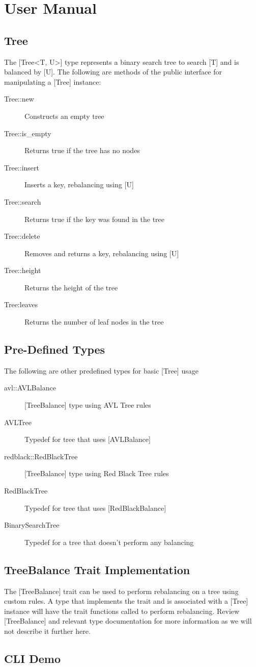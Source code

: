 \documentclass[11pt, letterpaper]{article}
\begin{document}
\pagebreak

\section{User Manual}

\subsection{Tree}
The [Tree\textless T, U\textgreater ] type represents a binary search tree to search [T] and is balanced by [U].
The following are methods of the public interface for manipulating a [Tree] instance:
\begin{description}
    \item[Tree::new] Constructs an empty tree
    \item[Tree::is\_empty] Returns true if the tree has no nodes
    \item[Tree::insert] Inserts a key, rebalancing using [U]
    \item[Tree::search] Returns true if the key was found in the tree
    \item[Tree::delete] Removes and returns a key, rebalancing using [U]
    \item[Tree::height] Returns the height of the tree
    \item[Tree:leaves] Returns the number of leaf nodes in the tree   
\end{description}

\subsection{Pre-Defined Types}
The following are other predefined types for basic [Tree] usage
\begin{description}
    \item[avl::AVLBalance] [TreeBalance] type using AVL Tree rules
    \item[AVLTree] Typedef for tree that uses [AVLBalance]
    \item[redblack::RedBlackTree] [TreeBalance] type using Red Black Tree rules
    \item[RedBlackTree] Typedef for tree that uses [RedBlackBalance]
    \item[BinarySearchTree] Typedef for a tree that doesn't perform any balancing
\end{description}

\subsection{TreeBalance Trait Implementation}
The [TreeBalance] trait can be used to perform rebalancing on a tree using custom rules.
A type that implements the trait and is associated with a [Tree] instance will have the trait functions called
to perform rebalancing.  Review [TreeBalance] and relevant type documentation for more information as we will not
describe it further here.

\subsection{CLI Demo}
\end{document}
